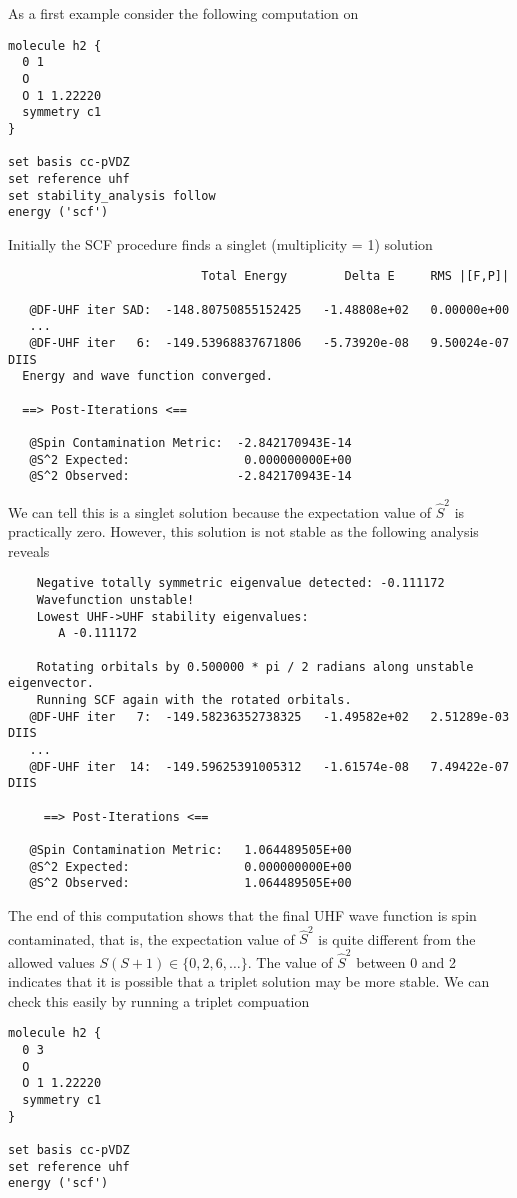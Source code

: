 \documentclass[../Main/chem532-notes.tex]{subfiles}
\begin{document}
As a first example consider the following computation on 
\begin{verbatim}
molecule h2 {
  0 1
  O
  O 1 1.22220
  symmetry c1
}

set basis cc-pVDZ
set reference uhf
set stability_analysis follow
energy ('scf')
\end{verbatim}
Initially the SCF procedure finds a singlet (multiplicity = 1) solution
\begin{verbatim}
                           Total Energy        Delta E     RMS |[F,P]|

   @DF-UHF iter SAD:  -148.80750855152425   -1.48808e+02   0.00000e+00
   ...
   @DF-UHF iter   6:  -149.53968837671806   -5.73920e-08   9.50024e-07 DIIS
  Energy and wave function converged.

  ==> Post-Iterations <==

   @Spin Contamination Metric:  -2.842170943E-14
   @S^2 Expected:                0.000000000E+00
   @S^2 Observed:               -2.842170943E-14
\end{verbatim}
We can tell this is a singlet solution because the expectation value of $\hat{S}^2$ is practically zero.
However, this solution is not stable as the following analysis reveals
\begin{verbatim}
    Negative totally symmetric eigenvalue detected: -0.111172
    Wavefunction unstable!
    Lowest UHF->UHF stability eigenvalues:
       A -0.111172

    Rotating orbitals by 0.500000 * pi / 2 radians along unstable eigenvector.
    Running SCF again with the rotated orbitals.
   @DF-UHF iter   7:  -149.58236352738325   -1.49582e+02   2.51289e-03 DIIS
   ...
   @DF-UHF iter  14:  -149.59625391005312   -1.61574e-08   7.49422e-07 DIIS
   
     ==> Post-Iterations <==

   @Spin Contamination Metric:   1.064489505E+00
   @S^2 Expected:                0.000000000E+00
   @S^2 Observed:                1.064489505E+00
\end{verbatim}
The end of this computation shows that the final UHF wave function is spin contaminated, that is, the expectation value of $\hat{S}^2$ is quite different from the allowed values $S(S +1) \in \{0, 2, 6, \ldots \}$. The value of $\hat{S}^2$ between 0 and 2 indicates that it is possible that a triplet solution may be more stable.
We can check this easily by running a triplet compuation 
\begin{verbatim}
molecule h2 {
  0 3
  O
  O 1 1.22220
  symmetry c1
}

set basis cc-pVDZ
set reference uhf
energy ('scf')
\end{verbatim}
\end{document}
